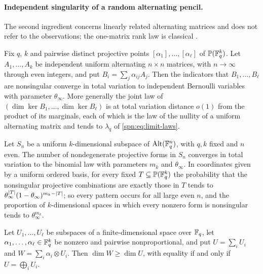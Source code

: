 \paragraph{Independent singularity of a random alternating pencil.}
The second ingredient concerns linearly related alternating matrices and does not refer to the
observations; the one-matrix rank law is classical \cite{Fulman2015Stein}.

\begin{theorem}\label{spn:thm:hidden-pencil}
Fix $q$, $k$ and pairwise distinct projective points $[\alpha_1],\dots,[\alpha_\ell]$ of
$\mathbb P(\mathbb{F}_q^k)$. Let $A_1,\dots,A_k$ be independent uniform alternating $n\times n$ matrices,
with $n\to\infty$ through even integers, and put $B_i=\sum_j\alpha_{ij}A_j$. Then the indicators
that $B_1,\dots,B_\ell$ are nonsingular converge in total variation to independent Bernoulli
variables with parameter $\theta_\infty$. More generally the joint law of
$(\dim\ker B_1,\dots,\dim\ker B_\ell)$ is at total variation distance $o(1)$ from the product of its
marginals, each of which is the law of the nullity of a uniform alternating matrix and tends to
$\lambda_q$ of \eqref{spn:eq:limit-laws}.
\end{theorem}

\begin{corollary}\label{spn:cor:hidden-pattern}
Let $S_n$ be a uniform $k$-dimensional subspace of $\operatorname{Alt}(\mathbb{F}_q^n)$, with $q,k$ fixed and $n$ even.
The number of nondegenerate projective forms in $S_n$ converges in total variation to the binomial
law with parameters $m_k$ and $\theta_\infty$. In coordinates given by a uniform ordered basis, for
every fixed $T\subseteq\mathbb P(\mathbb{F}_q^k)$ the probability that the nonsingular projective
combinations are exactly those in $T$ tends to $\theta_\infty^{\lvert T\rvert}(1-\theta_\infty)^{m_k-\lvert T\rvert}$;
so every pattern occurs for all large even $n$, and the proportion of $k$-dimensional spaces in which
every nonzero form is nonsingular tends to $\theta_\infty^{m_k}$.
\end{corollary}

\begin{lemma}\label{spn:lem:hidden-tensor}
Let $U_1,\dots,U_\ell$ be subspaces of a finite-dimensional space over $\mathbb{F}_q$, let
$\alpha_1,\dots,\alpha_\ell\in\mathbb{F}_q^k$ be nonzero and pairwise nonproportional, and put
$U=\sum_iU_i$ and $W=\sum_i\alpha_i\otimes U_i$. Then $\dim W\ge\dim U$, with equality if and only
if $U=\bigoplus_iU_i$.
\end{lemma}


